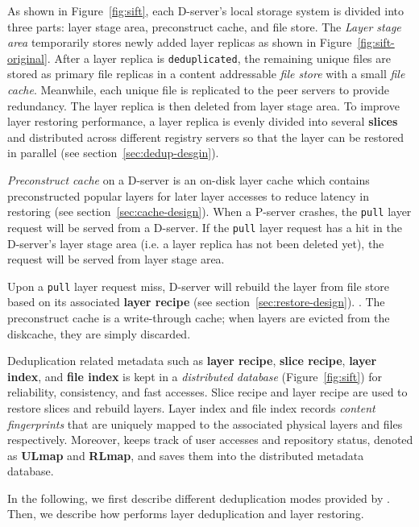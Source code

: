 As shown in Figure~\ref{fig:sift}, 
each D-server's local storage system is
divided into three parts: layer stage area, preconstruct cache, and file store. The \emph{Layer stage area} temporarily stores newly added layer replicas as shown in Figure~\ref{fig:sift-original}.
After a layer replica is \texttt{deduplicated}, 
the remaining unique files are stored as primary file replicas in a content 
addressable \emph{file store} with a small \emph{file cache}. 
Meanwhile, each unique file is replicated to the peer servers to provide redundancy.
The layer replica is then deleted from layer stage area.
To improve layer restoring performance, 
a layer replica is evenly divided into several \textbf{slices} and distributed across different registry servers so that
the layer can be restored in parallel (see section~\ref{sec:dedup-desgin}).
  
\emph{Preconstruct cache} on a D-server is an on-disk layer cache which contains preconstructed popular layers for later layer accesses to reduce latency in restoring (see section~\ref{sec:cache-design}).
When a P-server crashes,
the \texttt{pull} layer request will be served from a D-server.
If the \texttt{pull} layer request has a hit in the D-server's layer stage area (i.e. a layer replica has not been deleted yet),
the request will be served from layer stage area.

Upon a \texttt{pull} layer request miss, D-server will rebuild the layer from file store
based on its associated \textbf{layer recipe} (see section~\ref{sec:restore-design}). 
.
The preconstruct cache is a write-through cache; when layers are evicted from the diskcache, they are simply discarded.

Deduplication related metadata such as \textbf{layer recipe}, \textbf{slice recipe}, \textbf{layer index}, and \textbf{file index} is kept in a \emph{distributed database} (Figure~\ref{fig:sift}) for 
reliability, consistency, and fast accesses. 
Slice recipe and layer recipe are used to restore slices and rebuild layers.
Layer index and file index records \emph{content fingerprints} that are uniquely mapped to the associated physical layers and files respectively. %
Moreover, \sysname keeps track of user accesses and repository status, 
denoted as \textbf{ULmap} and \textbf{RLmap}, 
and saves them into the distributed metadata database.

In the following, we first describe different deduplication modes provided by \sysname.
Then, we describe how \sysname performs layer deduplication and layer restoring.

